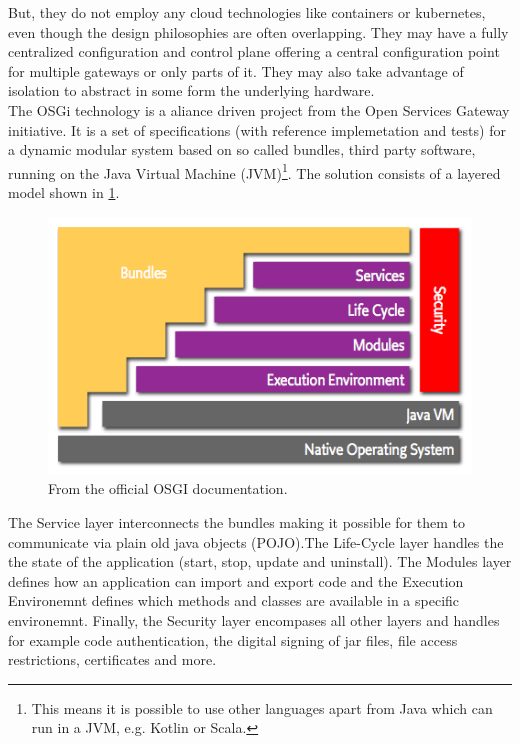 But, they do not employ any cloud technologies like containers or kubernetes, even though the design philosophies are often overlapping. They may have a fully centralized configuration and control plane offering a central configuration point for multiple gateways or only parts of it. They may also take advantage of isolation to abstract in some form the underlying hardware.\\
The OSGi technology\cite{osgiDefintion25:online} is a aliance driven project from the Open Services Gateway initiative. It is a set of specifications (with reference implemetation and tests) for a dynamic modular system based on so called bundles, third party software, running on the Java Virtual Machine (JVM)\footnote{This means it is possible to use other languages apart from Java which can run in a JVM, e.g. Kotlin or Scala.}. The solution consists of a layered model shown in \cref{fig:osgiLayerModel}. 
\begin{figure}[h!]
    \centering
    \includegraphics[scale=0.8]{figures/layering-osgi.png}
    \caption{From the official OSGI documentation\cite{osgiFrameworkArchitec22:online}.}
    \label{fig:osgiLayerModel}
\end{figure}
The Service layer interconnects the bundles making it possible for them to communicate via plain old java objects (POJO).The Life-Cycle layer handles the the state of the application (start, stop, update and uninstall). The Modules layer defines how an application can import and export code and the Execution Environemnt defines which methods and classes are available in a specific environemnt. Finally, the Security layer encompases all other layers and handles for example code authentication, the digital signing of jar files, file access restrictions, certificates and more.\\
